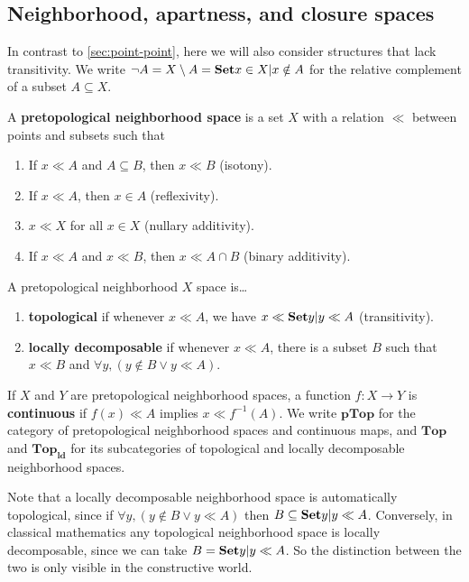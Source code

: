 \documentclass{article}
\def\cpl#1{\neg #1}
\def\inv{^{-1}}
\def\nn{\ensuremath{\neg\neg}}
\def\PTop{\mathbf{pTop}}
\def\Top{\mathbf{Top}}
\def\PTopnn{\mathbf{pTop}_{\nn}}
\def\ldTop{\mathbf{Top}_{\mathbf{ld}}}
\begin{document}
\subsection{Neighborhood, apartness, and closure spaces}
\label{sec:top}

In contrast to \cref{sec:point-point}, here we will also consider structures that lack transitivity.
We write $\cpl{A} = X\setminus A = \setof{x\in X | x\notin A}$ for the relative complement of a subset $A\subseteq X$.

\begin{defn}
  A \textbf{pretopological neighborhood space} is a set $X$ with a relation $\ll$ between points and subsets such that
  \begin{enumerate}
  \item If $x\ll A$ and $A\subseteq B$, then $x\ll B$ (isotony).
  \item If $x\ll A$, then $x\in A$ (reflexivity).
  \item $x\ll X$ for all $x\in X$ (nullary additivity).
  \item If $x\ll A$ and $x\ll B$, then $x\ll A\cap B$ (binary additivity).
  \end{enumerate}
  A pretopological neighborhood $X$ space is\dots
  \begin{enumerate}[resume]
  \item \textbf{topological} if whenever $x\ll A$, we have $x \ll \setof{ y | y\ll A}$ (transitivity).
  \item \textbf{locally decomposable} if whenever $x\ll A$, there is a subset $B$ such that $x\ll B$ and $\forall y, (y\notin B \lor y \ll A)$.
  \end{enumerate}
  If $X$ and $Y$ are pretopological neighborhood spaces, a function $f:X\to Y$ is \textbf{continuous} if $f(x)\ll A$ implies $x\ll f\inv(A)$.
  We write $\PTop$ for the category of pretopological neighborhood spaces and continuous maps, and $\Top$
  and $\ldTop$ for its subcategories of topological %
  and locally decomposable neighborhood spaces.
\end{defn}

Note that a locally decomposable neighborhood space is automatically topological, %
since if $\forall y, (y\notin B \lor y \ll A)$ then %
$B \subseteq \setof{ y | y\ll A}$.
Conversely, in classical mathematics any topological neighborhood space is locally decomposable, since we can take $B = \setof{ y | y\ll A}$.
So the distinction between the two is only visible in the constructive world.
\end{document}
